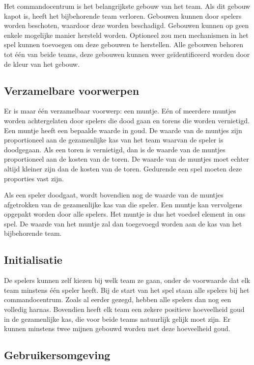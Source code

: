     Het commandocentrum is het belangrijkste gebouw van het team. Als dit gebouw kapot is, heeft het bijbehorende team verloren. Gebouwen kunnen door spelers worden beschoten, waardoor deze worden beschadigd. Gebouwen kunnen op geen enkele mogelijke manier hersteld worden. Optioneel zou men mechanismen in het spel kunnen toevoegen om deze gebouwen te herstellen. Alle gebouwen behoren tot \'e\'en van beide teams, deze gebouwen kunnen weer ge\"identificeerd worden door de kleur van het gebouw.

    \subsection{Verzamelbare voorwerpen}
    Er is maar \'e\'en verzamelbaar voorwerp: een muntje. E\'en of meerdere muntjes worden achtergelaten door spelers die dood gaan en torens die worden vernietigd. Een muntje heeft een bepaalde waarde in goud. De waarde van de muntjes zijn proportioneel aan de gezamenlijke kas van het team waarvan de speler is doodgegaan. Als een toren is vernietigd, dan is de waarde van de muntjes proportioneel aan de kosten van de toren. De waarde van de muntjes moet echter altijd kleiner zijn dan de kosten van de toren. Gedurende een spel moeten deze proporties vast zijn.

    Als een speler doodgaat, wordt bovendien nog de waarde van de muntjes afgetrokken van de gezamenlijke kas van die speler. Een muntje kan vervolgens opgepakt worden door alle spelers. Het muntje is dus het voedsel element in ons spel. De waarde van het muntje zal dan toegevoegd worden aan de kas van het bijbehorende team.

    \subsection{Initialisatie}
    De spelers kunnen zelf kiezen bij welk team ze gaan, onder de voorwaarde dat elk team minstens \'e\'en speler heeft. Bij de start van het spel staan alle spelers bij het commandocentrum. Zoals al eerder gezegd, hebben alle spelers dan nog een volledig harnas. Bovendien heeft elk team een zekere positieve hoeveelheid goud in de gezamenlijke kas, die voor beide teams natuurlijk gelijk moet zijn. Er kunnen minstens twee mijnen gebouwd worden met deze hoeveelheid goud.
    \FloatBarrier

    \subsection{Gebruikersomgeving}
    \label{sec:UI}

